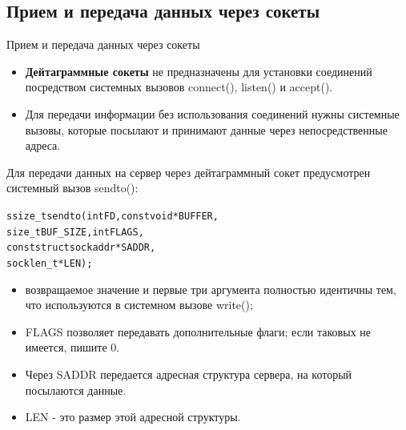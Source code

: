 \documentclass{beamer}
\begin{document}
\subsection{Прием и передача данных через сокеты}
\begin{frame}[fragile]{Прием и передача данных через сокеты}
	\begin{itemize}
		\item \textbf{Дейтаграммные сокеты} не предназначены для установки соединений посредством системных вызовов connect(), listen() и accept(). 
		\item Для передачи информации без использования соединений нужны системные вызовы, которые посылают и принимают данные через непосредственные адреса.
	\end{itemize}
	Для передачи данных на сервер через дейтаграммный сокет предусмотрен системный вызов sendto():
	\begin{alltt}
	ssize_t sendto (int FD, const void * BUFFER,
                    size_t BUF_SIZE, int FLAGS,
                    const struct sockaddr * SADDR,
                    socklen_t * LEN);
	\end{alltt}
	\begin{itemize}
		\item возвращаемое значение и первые три аргумента полностью идентичны тем, что используются в системном вызове write();
		\item FLAGS позволяет передавать дополнительные флаги; если таковых не имеется, пишите 0. 
		\item Через SADDR передается адресная структура сервера, на который посылаются данные. 
		\item LEN - это размер этой адресной структуры.
	\end{itemize}
\end{frame}
\end{document}
